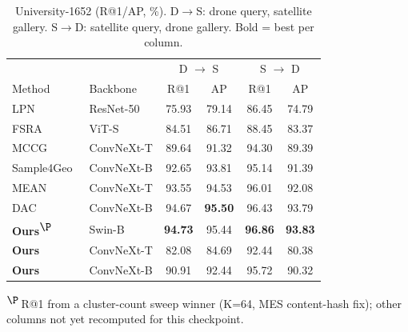 \documentclass[conference]{IEEEtran}
\begin{document}
\begin{table}[t]
\caption{University-1652 (R@1/AP, \%). D$\to$S: drone query, satellite
gallery. S$\to$D: satellite query, drone gallery. Bold = best per column.}
\label{tab:soa_u1652}
\centering
\footnotesize
\setlength{\tabcolsep}{3pt}
\begin{tabular}{l l cc cc}
\toprule
& & \multicolumn{2}{c}{D $\to$ S} & \multicolumn{2}{c}{S $\to$ D} \\
Method & Backbone & R@1 & AP & R@1 & AP \\
\midrule
LPN~\cite{wang2021lpn}                 & ResNet-50  & 75.93 & 79.14 & 86.45 & 74.79 \\
FSRA~\cite{dai2022fsra}                & ViT-S      & 84.51 & 86.71 & 88.45 & 83.37 \\
MCCG~\cite{shen2024mccg}               & ConvNeXt-T & 89.64 & 91.32 & 94.30 & 89.39 \\
Sample4Geo~\cite{deuser2023sample4geo} & ConvNeXt-B & 92.65 & 93.81 & 95.14 & 91.39 \\
MEAN~\cite{chen2025mean}               & ConvNeXt-T & 93.55 & 94.53 & 96.01 & 92.08 \\
DAC~\cite{xia2024dac}                  & ConvNeXt-B & 94.67 & \textbf{95.50} & 96.43 & 93.79 \\
\midrule
\textbf{Ours}\textsuperscript{$\P$} & Swin-B     & \textbf{94.73} & 95.44 & \textbf{96.86} & \textbf{93.83} \\
\textbf{Ours} & ConvNeXt-T & 82.08 & 84.69 & 92.44 & 80.38 \\
\textbf{Ours} & ConvNeXt-B & 90.91 & 92.44 & 95.72 & 90.32 \\
\bottomrule
\end{tabular}

\smallskip
\raggedright\footnotesize
\textsuperscript{$\P$}\,R@1 from a cluster-count sweep winner (K=64, MES
content-hash fix); other columns not yet recomputed for this checkpoint.
\end{table}
\end{document}
